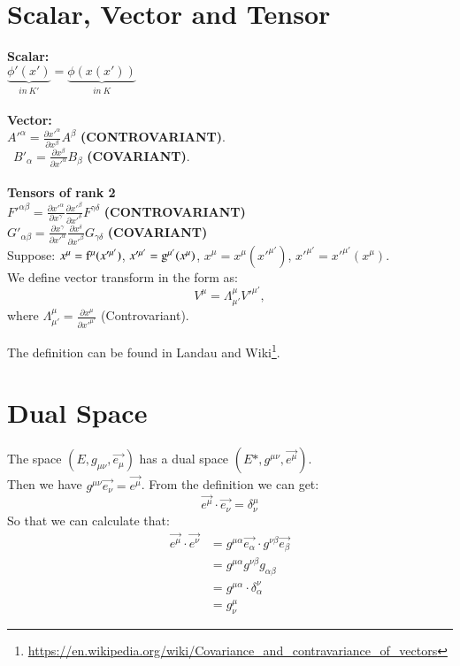 \documentclass[openany,10pt]{book}
\theoremstyle{definition}
\theoremstyle{definition}
\theoremstyle{remark}
\begin{document}
\section{Scalar, Vector and Tensor}

\textbf{Scalar:}\\ $\underbrace{\phi'(x')}_{in \ K'}=\underbrace{\phi(x(x'))}_{in \ K}$\\\\
\textbf{Vector:}\\$A'^\alpha=\frac{\partial x'^\alpha}{\partial x^\beta}A^\beta$  \textbf{(CONTROVARIANT)}.\\
       \  $B'_\alpha=\frac{\partial x^\beta}{\partial x'^\alpha}B_\beta$   \textbf{(COVARIANT)}.\\\\
\textbf{Tensors of rank 2}\\
$F'^{\alpha\beta}=\frac{\partial x'^\alpha}{\partial x^\gamma}\frac{\partial x'^\beta}{\partial x'^\delta}F^{\gamma\delta}$   \textbf{(CONTROVARIANT)}\\
$G'_{\alpha\beta}=\frac{\partial x^\gamma}{\partial x'^\alpha}\frac{\partial x^\delta}{\partial x'^\beta}G_{\gamma\delta}$    \textbf{(COVARIANT)}\\

Suppose: $x^\mu={\rm f}^\mu(x'^{\mu'})$, $x'^{\mu'}={\rm g}^{\mu'}(x^\mu)$, $x^\mu=x^\mu(x'^{\mu'})$, $x'^{\mu'}=x'^{\mu'}(x^\mu)$.\\
We define vector transform in the form as:
\begin{equation}
    V^\mu=\Lambda^\mu_{\mu'}V'^{\mu'},
\end{equation}
where $\Lambda^\mu_{\mu'}=\frac{\partial x^\mu}{\partial x'^{\mu'}}$ (Controvariant). 

The definition can be found in Landau and Wiki\footnote{\url{https://en.wikipedia.org/wiki/Covariance_and_contravariance_of_vectors}}.


\section{Dual Space}
The space $(E,g_{\mu\nu},\vec{e_\mu})$ has a dual space $(E*,g^{\mu\nu},\vec{e^\mu})$.
\\
Then we have $g^{\mu\nu}\vec{e_\nu}=\vec{e^\mu}$.
From the definition we can get:
\begin{equation}
    \vec{e^\mu}\cdot\vec{e_\nu}=\delta^\mu_\nu
\end{equation}
So that we can calculate that:
\begin{equation}
    \begin{aligned}
    \vec{e^\mu}\cdot\vec{e^\nu}&=g^{\mu\alpha}\vec{e_\alpha}\cdot g^{\nu\beta}\vec{e_\beta}\\
    &=g^{\mu\alpha}g^{\nu\beta}g_{\alpha\beta}\\
    &=g^{\mu\alpha}\cdot\delta^\nu_\alpha\\
    &=g^\mu_\nu
    \end{aligned}
\end{equation}
\end{document}
